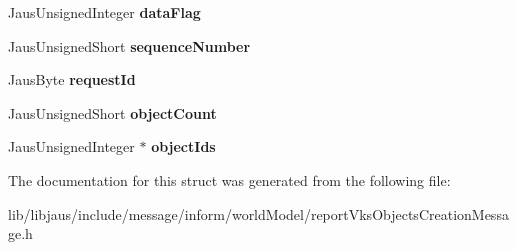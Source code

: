 \begin{DoxyCompactItemize}
\item 
\hypertarget{struct_report_vks_objects_creation_message_struct_a92e7c988f791ab39b076a3fec641b211}{\-Jaus\-Unsigned\-Integer {\bfseries data\-Flag}}\label{struct_report_vks_objects_creation_message_struct_a92e7c988f791ab39b076a3fec641b211}

\item 
\hypertarget{struct_report_vks_objects_creation_message_struct_a68be127c02acfe676ec868b56a50e486}{\-Jaus\-Unsigned\-Short {\bfseries sequence\-Number}}\label{struct_report_vks_objects_creation_message_struct_a68be127c02acfe676ec868b56a50e486}

\item 
\hypertarget{struct_report_vks_objects_creation_message_struct_afddaaf0879946e9541bc0e388093bc23}{\-Jaus\-Byte {\bfseries request\-Id}}\label{struct_report_vks_objects_creation_message_struct_afddaaf0879946e9541bc0e388093bc23}

\item 
\hypertarget{struct_report_vks_objects_creation_message_struct_a389b5142b7f57cfb042e512d820e293a}{\-Jaus\-Unsigned\-Short {\bfseries object\-Count}}\label{struct_report_vks_objects_creation_message_struct_a389b5142b7f57cfb042e512d820e293a}

\item 
\hypertarget{struct_report_vks_objects_creation_message_struct_a017a17821be7132695735d8dbd2bf236}{\-Jaus\-Unsigned\-Integer $\ast$ {\bfseries object\-Ids}}\label{struct_report_vks_objects_creation_message_struct_a017a17821be7132695735d8dbd2bf236}

\end{DoxyCompactItemize}


\-The documentation for this struct was generated from the following file\-:\begin{DoxyCompactItemize}
\item 
lib/libjaus/include/message/inform/world\-Model/report\-Vks\-Objects\-Creation\-Message.\-h\end{DoxyCompactItemize}
